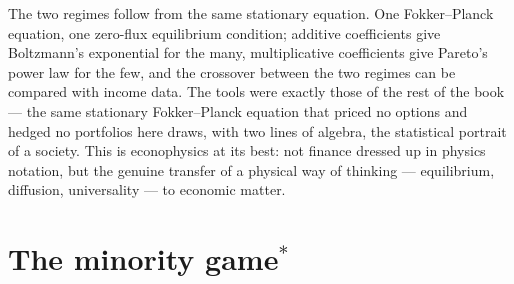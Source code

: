 \medskip

The two regimes follow from the same stationary equation.
One Fokker--Planck equation, one zero-flux equilibrium condition; additive coefficients give Boltzmann's exponential for the many, multiplicative coefficients give Pareto's power law for the few, and the crossover between the two regimes can be compared with income data.
The tools were exactly those of the rest of the book --- the same stationary Fokker--Planck equation that priced no options and hedged no portfolios here draws, with two lines of algebra, the statistical portrait of a society.
This is econophysics at its best: not finance dressed up in physics notation, but the genuine transfer of a physical way of thinking --- equilibrium, diffusion, universality --- to economic matter.


\section[The minority game*]{The minority game\texorpdfstring{$^*$}{*}}

\begin{center}
\end{center}
